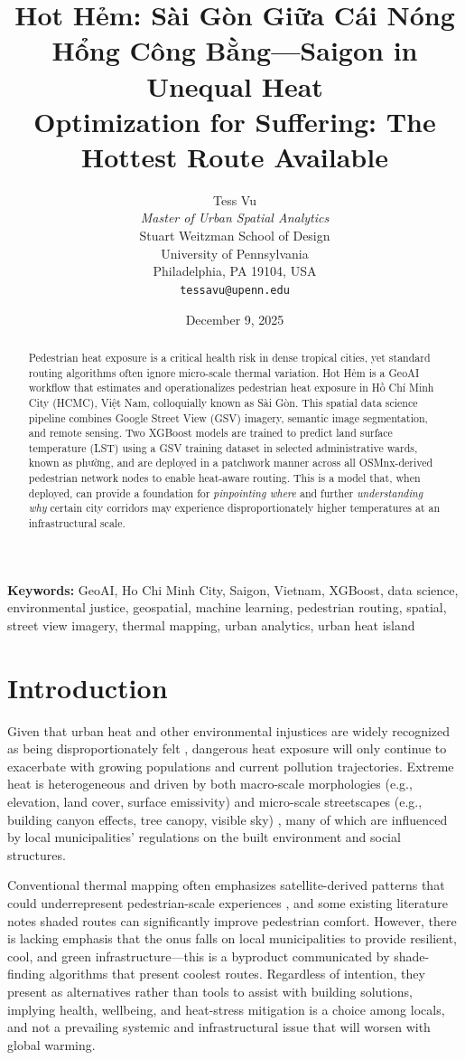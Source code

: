 \documentclass[
]{article}
\title{Hot Hẻm: Sài Gòn Giữa Cái Nóng Hổng Công Bằng---Saigon in Unequal Heat\\
\large Optimization for Suffering: The Hottest Route Available}
\author{Tess Vu\\
\textit{Master of Urban Spatial Analytics}\\
Stuart Weitzman School of Design\\
University of Pennsylvania\\
Philadelphia, PA 19104, USA\\
\texttt{tessavu@upenn.edu}}
\date{December 9, 2025}
\begin{document}
\maketitle

\begin{abstract}
Pedestrian heat exposure is a critical health risk in dense tropical cities, yet standard routing algorithms often ignore micro-scale thermal variation. Hot Hẻm is a GeoAI workflow that estimates and operationalizes pedestrian heat exposure in Hồ Chí Minh City (HCMC), Việt Nam, colloquially known as Sài Gòn. This spatial data science pipeline combines Google Street View (GSV) imagery, semantic image segmentation, and remote sensing. Two XGBoost models are trained to predict land surface temperature (LST) using a GSV training dataset in selected administrative wards, known as phường, and are deployed in a patchwork manner across all OSMnx-derived pedestrian network nodes to enable heat-aware routing. This is a model that, when deployed, can provide a foundation for \emph{pinpointing where} and further \emph{understanding why} certain city corridors may experience disproportionately higher temperatures at an infrastructural scale.
\end{abstract}

\noindent\textbf{Keywords:} GeoAI, Ho Chi Minh City, Saigon, Vietnam, XGBoost, data science, environmental justice, geospatial, machine learning, pedestrian routing, spatial, street view imagery, thermal mapping, urban analytics, urban heat island

\section{Introduction}
\label{sec:introduction}

Given that urban heat and other environmental injustices are widely recognized as being disproportionately felt \citep{chakraborty2019}, dangerous heat exposure will only continue to exacerbate with growing populations and current pollution trajectories. Extreme heat is heterogeneous and driven by both macro-scale morphologies (e.g., elevation, land cover, surface emissivity) and micro-scale streetscapes (e.g., building canyon effects, tree canopy, visible sky) \citep{oke1982}, many of which are influenced by local municipalities' regulations on the built environment and social structures.

Conventional thermal mapping often emphasizes satellite-derived patterns that could underrepresent pedestrian-scale experiences \citep{middel2019}, and some existing literature notes shaded routes can significantly improve pedestrian comfort. However, there is lacking emphasis that the onus falls on local municipalities to provide resilient, cool, and green infrastructure---this is a byproduct communicated by shade-finding algorithms that present coolest routes. Regardless of intention, they present as alternatives rather than tools to assist with building solutions, implying health, wellbeing, and heat-stress mitigation is a choice among locals, and not a prevailing systemic and infrastructural issue that will worsen with global warming.
\end{document}
